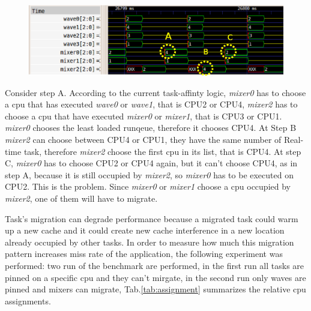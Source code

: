 \begin{figure}[h]
\centering
\includegraphics[width=\widefigure]{images/migr_i7.eps}
\caption{}
\label{fig:migr_pat}
\end{figure}

Consider step A. According to the current task-affinty logic, \textit{mixer0} has to choose a cpu that has executed \textit{wave0} or 
\textit{wave1}, that is CPU2 or CPU4, \textit{mixer2} has to choose a cpu that have executed \textit{mixer0} or \textit{mixer1}, that is CPU3 or 
CPU1. \textit{mixer0} chooses the least loaded runqeue, therefore it chooses CPU4. At Step B \textit{mixer2} can choose between CPU4 or CPU1, they 
have the same number of Real-time task, therefore \textit{mixer2} choose the first cpu in its list, that is CPU4. At step C, \textit{mixer0} has to 
choose CPU2 or CPU4 again, but it can't choose CPU4, as in step A, because it is still occupied by \textit{mixer2}, so \textit{mixer0} has to be 
executed on CPU2. This is the problem. Since \textit{mixer0} or \textit{mixer1} choose a cpu occupied by \textit{mixer2}, one of them will have to 
migrate.

Task's migration can degrade performance because a migrated task could warm up a new cache and it could create new cache interference in a new 
location already occupied by other tasks. In order to measure how much this migration pattern increases miss rate of the application, the following 
experiment was performed: two run of the benchmark are performed, in the first run all tasks are pinned on a specific cpu and they can't mirgate, in 
the second run only waves are pinned and mixers can migrate, Tab.\ref{tab:assignment} summarizes the relative cpu assignments. 

